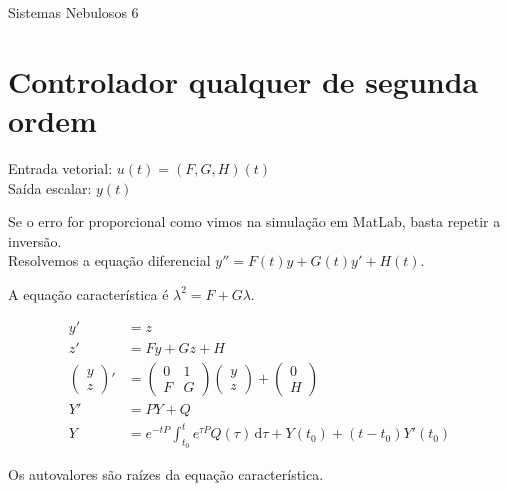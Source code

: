 \documentclass[12pt]{article}
\begin{document}
\Large

\begin{center}
Sistemas Nebulosos 6
\end{center}

\normalsize

\vspace{3mm}

\section{Controlador qualquer de segunda ordem}

\begin{flushleft}
Entrada vetorial: $u(t) = (F,G,H)(t)$ \\
Sa\'ida escalar: $y(t)$
\end{flushleft}

Se o erro for proporcional como vimos na simula\c{c}\~ao em MatLab, basta repetir a invers\~ao. \\

Resolvemos a equa\c{c}\~ao diferencial $y'' = F(t) y + G(t) y' + H(t)$.

A equa\c{c}\~ao caracter\'istica \'e $\lambda^2 = F + G\lambda$.

\begin{align}
 y' &= z \\
 z' &= Fy + Gz + H \\
 \begin{pmatrix} y \\ z \end{pmatrix}' &= \begin{pmatrix} 0 & 1 \\ F & G \end{pmatrix}\begin{pmatrix} y \\ z \end{pmatrix} + \begin{pmatrix} 0 \\ H \end{pmatrix} \\
 Y' &= P Y + Q \\
 Y &= e^{-tP} \int_{t_0}^t e^{\tau P} Q(\tau)\, \mathrm{d}\tau + Y(t_0) + (t-t_0) Y'(t_0)
\end{align}

Os autovalores s\~ao ra\'izes da equa\c{c}\~ao caracter\'istica.
\end{document}
